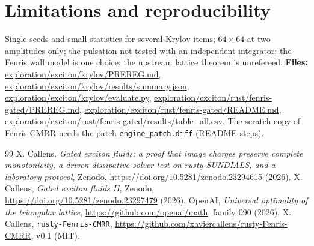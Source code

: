 \documentclass[11pt,a4paper]{article}
\begin{document}
\section{Limitations and reproducibility}\label{sec:repro}

Single seeds and small statistics for several Krylov items; $64\times64$ at two amplitudes only; the pulsation not tested with an
independent integrator; the Fenris wall model is one choice; the upstream lattice theorem is unrefereed. \textbf{Files:}
\url{exploration/exciton/krylov/PREREG.md}, \url{exploration/exciton/krylov/results/summary.json}, \url{exploration/exciton/krylov/evaluate.py},
\url{exploration/exciton/rust/fenris-gated/PREREG.md}, \url{exploration/exciton/rust/fenris-gated/README.md},
\url{exploration/exciton/rust/fenris-gated/results/table_all.csv}. The scratch copy of Fenris-CMRR needs the patch
\texttt{engine\_patch.diff} (README steps).

\begin{thebibliography}{99}\small
{} X. Callens, \emph{Gated exciton fluids: a proof that image charges preserve complete monotonicity, a
driven-dissipative solver test on rusty-SUNDIALS, and a laboratory protocol}, Zenodo, \url{https://doi.org/10.5281/zenodo.23294615} (2026).
 X. Callens, \emph{Gated exciton fluids II}, Zenodo, \url{https://doi.org/10.5281/zenodo.23297479} (2026).
 OpenAI, \emph{Universal optimality of the triangular lattice}, \url{https://github.com/openai/math}, family 090 (2026).
 X. Callens, \texttt{rusty-Fenris-CMRR}, \url{https://github.com/xaviercallens/rusty-Fenris-CMRR}, v0.1 (MIT).
\end{thebibliography}
\end{document}
